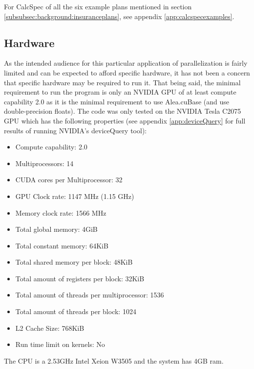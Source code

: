 For CalcSpec of all the six example plans mentioned in section \ref{subsubsec:background:insuranceplans}, see appendix \ref{app:calcspecexamples}.

\subsection{Hardware}\label{subsec:background:hardware}
As the intended audience for this particular application of parallelization is fairly limited and can be expected to afford specific hardware, it has not been a concern that specific hardware may be required to run it.
That being said, the minimal requirement to run the program is only an NVIDIA GPU of at least compute capability 2.0 as it is the minimal requirement to use Alea.cuBase (and use double-precision floats).
The code was only tested on the NVIDIA Tesla C2075 GPU which has the following properties (see appendix \ref{app:deviceQuery} for full results of running NVIDIA's deviceQuery tool):

\begin{itemize}
\item Compute capability: 2.0
\item Multiprocessors: 14
\item CUDA cores per Multiprocessor: 32
\item GPU Clock rate: 1147 MHz (1.15 GHz)
\item Memory clock rate: 1566 MHz
\item Total global memory: 4GiB
\item Total constant memory: 64KiB
\item Total shared memory per block: 48KiB
\item Total amount of registers per block: 32KiB
\item Total amount of threads per multiprocessor: 1536
\item Total amount of threads per block: 1024
\item L2 Cache Size: 768KiB
\item Run time limit on kernels: No
\end{itemize}

The CPU is a 2.53GHz Intel Xeion W3505 and the system has 4GB ram.